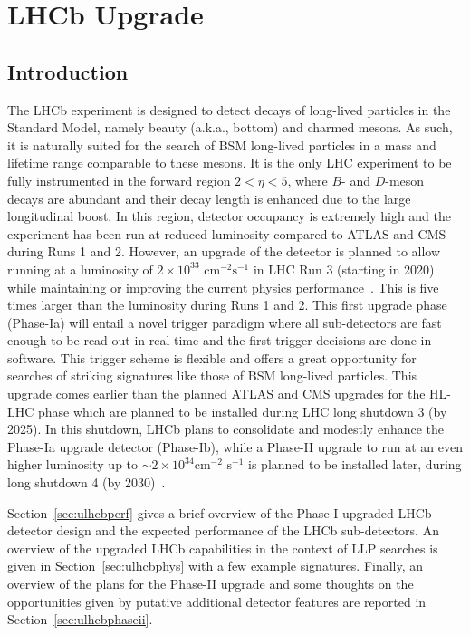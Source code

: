 \section{LHCb Upgrade}\label{sec:LHCb_upgrade}
\subsection{Introduction}

The LHCb experiment is designed to detect decays of long-lived particles in the Standard Model, namely beauty (a.k.a., bottom) and charmed mesons. As such, it is naturally suited for the search of BSM long-lived particles in a mass and lifetime range comparable to these mesons. It is the only LHC experiment to be fully instrumented in the forward region $2<\eta<5$, where $B$- and $D$-meson decays are abundant and their decay length is enhanced due to the large longitudinal boost. In this region, detector occupancy is extremely high and the experiment has been run at reduced luminosity compared to ATLAS and CMS during Runs 1 and 2. However, an upgrade of the detector is planned to allow running at a luminosity of $2\times 10^{33}\,\,\text{cm}^{-2}\text{s}^{-1}$ in LHC Run 3 (starting in 2020) while maintaining or improving the current physics performance~\cite{LHCbUpgradeTDR}. This is five times larger than the luminosity during Runs 1 and 2. This first upgrade phase (Phase-Ia) will entail a novel trigger paradigm where all sub-detectors are fast enough to be read out in real time and the first trigger decisions are done in software. This trigger scheme is flexible and offers a great opportunity for searches of striking signatures like those of BSM long-lived particles. This upgrade comes earlier than the planned ATLAS and CMS upgrades for the HL-LHC phase which are planned to be installed during LHC long shutdown 3 (by 2025). In this shutdown, LHCb plans to consolidate and modestly enhance the Phase-Ia upgrade detector (Phase-Ib), while a Phase-II upgrade to run at an even higher luminosity up to $\sim 2\times 10^{34}\text{cm}^{-2}\,\,\text{s}^{-1}$ is planned to be installed later, during long shutdown 4 (by 2030)~\cite{LHCbUpgradeIIPC}.

Section~\ref{sec:ulhcbperf} gives a brief overview of the Phase-I upgraded-LHCb detector design and the expected performance of the LHCb sub-detectors. An overview of the upgraded LHCb capabilities in the context of LLP searches is given in Section~\ref{sec:ulhcbphys} with a few example signatures. Finally, an overview of the plans for the Phase-II upgrade and some thoughts on the opportunities given by putative additional detector features are reported in Section~\ref{sec:ulhcbphaseii}.

